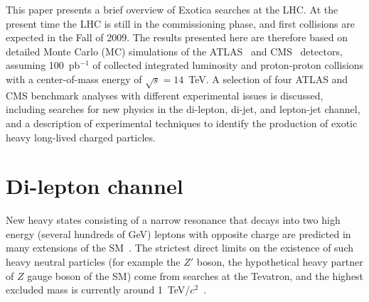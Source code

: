 \documentclass{cimento}
\begin{document}
This paper presents a brief overview of Exotica searches at the LHC. 
At the present time the LHC is still in the commissioning phase, 
and first collisions are expected in the Fall of 2009.
The results presented here are therefore based on detailed 
Monte Carlo (MC) simulations of the ATLAS~\cite{Aad:2009wy} and 
CMS~\cite{Bayatian:2006zz,Ball:2007zza} detectors, assuming 100~pb$^{-1}$ 
of collected integrated luminosity and proton-proton collisions 
with a center-of-mass energy of $\sqrt{s} = 14$~TeV. 
A selection of four ATLAS and CMS benchmark analyses with different 
experimental issues is discussed, including 
searches for new physics in the di-lepton, di-jet, and lepton-jet
channel, and a description of experimental techniques to identify the production of 
exotic heavy long-lived charged particles.


\section{Di-lepton channel} \label{dilepton}

New heavy states consisting of a narrow resonance that decays 
into two high energy (several hundreds of GeV) 
leptons with opposite charge are predicted in  
many extensions of the 
SM~\cite{Georgi:1974sy,ArkaniHamed:2001nc,Randall:1999ee,Lane:1999uh}.
The strictest direct limits on the existence of such 
heavy neutral particles (for example the $Z'$ boson, the hypothetical 
heavy partner of $Z$ gauge boson of the SM) come from searches 
at the Tevatron, and the highest excluded mass is currently around 
1~TeV/$c^2$~\cite{Aaltonen:2008vx,Aaltonen:2008ah,Abazov:2007ra}.
\end{document}
